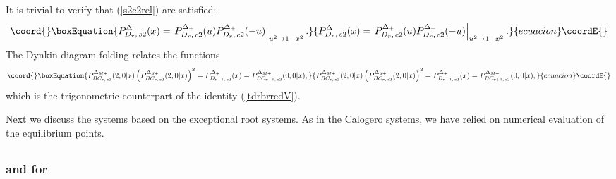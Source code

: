 \documentclass[a4paper,12pt]{article}
\providecommand{\vT}{\vphantom{\mbox{\twozero I}}}
\begin{document}
It is trivial to verify that (\ref{s2c2rel}) are satisfied:
\begin{equation}\coord{}\boxEquation{
   P_{D_r,\,s2}^{{\Delta}}(x)
   =\left.\vT P_{D_r,\,c2}^{{\Delta}_+}(u)P_{D_r,\,c2}^{{\Delta}_+}(-u)
   \right|_{u^2\to1-x^2}.
}{
   P_{D_r,\,s2}^{{\Delta}}(x)
   =\left.\vT P_{D_r,\,c2}^{{\Delta}_+}(u)P_{D_r,\,c2}^{{\Delta}_+}(-u)
   \right|_{u^2\to1-x^2}.
}{ecuacion}\coordE{}\end{equation}
The Dynkin diagram folding \coordHE{} relates the functions
\begin{equation}\coord{}\boxEquation{
   P_{BC_{r,\,c2}}^{\Delta_{M+}}(2,0|x)
   \left(P_{BC_{r,\,c2}}^{\Delta_{S+}}(2,0|x)\right)^2=
   P_{D_{r+1,\,c2}}^{\Delta_+}(x)=P_{BC_{r+1,\,c2}}^{\Delta_{M+}}(0,0|x), 
   \label{tdrbrredDel}
}{
   P_{BC_{r,\,c2}}^{\Delta_{M+}}(2,0|x)
   \left(P_{BC_{r,\,c2}}^{\Delta_{S+}}(2,0|x)\right)^2=
   P_{D_{r+1,\,c2}}^{\Delta_+}(x)=P_{BC_{r+1,\,c2}}^{\Delta_{M+}}(0,0|x), 
   }{ecuacion}\coordE{}\end{equation}
which is the  trigonometric counterpart of the identity (\ref{tdrbrredV}).

\bigskip
Next we discuss the systems based on the exceptional root systems.
As in the Calogero systems, we have relied on numerical evaluation of
the equilibrium points.

\subsection{\coordHE{}}

\subsubsection{\coordHE{} and \myHighlight{$\Delta$}\coordHE{} for \coordHE{}}
\end{document}
